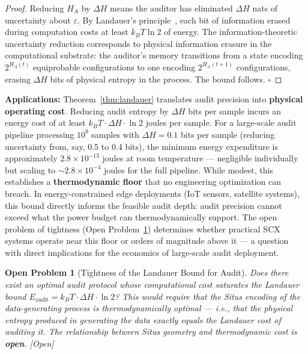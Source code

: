 \documentclass[12pt,a4paper]{article}
\newtheorem{openproblem}[theorem]{Open Problem}
\newcommand{\openquest}{\textcolor{red!70!black}{\small\textsf{[Open]}}}
\begin{document}
\begin{proof}
Reducing $H_A$ by $\Delta H$ means the auditor has eliminated $\Delta H$ nats
of uncertainty about $\varepsilon$.  By Landauer's principle~\citep{landauer1961irreversibility},
each bit of information erased during computation costs at least $k_B T\ln2$
of energy.  The information-theoretic uncertainty reduction corresponds to
physical information erasure in the computational substrate: the auditor's
memory transitions from a state encoding $2^{H_A(t)}$ equiprobable
configurations to one encoding $2^{H_A(t+1)}$ configurations, erasing
$\Delta H$ bits of physical entropy in the process.  The bound follows.
$\square$
\end{proof}

\medskip\noindent
\textbf{Applications:}
Theorem~\ref{thm:landauer} translates audit precision into \textbf{physical
operating cost}.  Reducing audit entropy by $\Delta H$ bits per sample incurs
an energy cost of at least $k_B T\cdot\Delta H\cdot\ln 2$ joules per sample.
For a large-scale audit pipeline processing $10^9$ samples with
$\Delta H=0.1$ bits per sample (reducing uncertainty from, say, 0.5 to 0.4
bits), the minimum energy expenditure is approximately $2.8\times10^{-13}$
joules at room temperature — negligible individually but scaling to
$\sim2.8\times10^{-4}$ joules for the full pipeline.  While modest, this
establishes a \textbf{thermodynamic floor} that no engineering optimization
can breach.  In energy-constrained edge deployments (IoT sensors, satellite
systems), this bound directly informs the feasible audit depth: audit
precision cannot exceed what the power budget can thermodynamically support.
The open problem of tightness (Open Problem~\ref{prob:landauer-tight})
determines whether practical SCX systems operate near this floor or orders of
magnitude above it — a question with direct implications for the economics of
large-scale audit deployment.

\begin{openproblem}[Tightness of the Landauer Bound for Audit]
\label{prob:landauer-tight}
Does there exist an optimal audit protocol whose computational cost
\emph{saturates} the Landauer bound $E_{\mathrm{audit}} = k_B T\cdot\Delta H\cdot\ln2$?
This would require that the Situs encoding of the data-generating process is
thermodynamically optimal — i.e., that the physical entropy produced in
generating the data exactly equals the Landauer cost of auditing it.  The
relationship between Situs geometry and thermodynamic cost is \textbf{open}.
\openquest
\end{openproblem}
\end{document}
